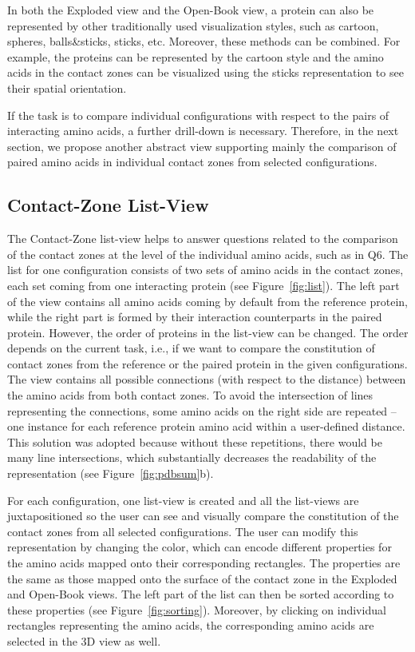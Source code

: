 \documentclass{bmcart}
\def\OpBook {Open-Book view\xspace}
\def\ExpView {Exploded view\xspace}
\def\CoZoListView {Contact-Zone list-view\xspace}
\begin{document}
In both the \ExpView and the \OpBook, a protein can also be represented by other traditionally used visualization styles, such as cartoon, spheres, balls\&sticks, sticks, etc.
Moreover, these methods can be combined. 
For example, the proteins can be represented by the cartoon style and the amino acids in the contact zones can be visualized using the sticks representation to see their spatial orientation.%

If the task is to compare individual configurations with respect to the pairs of interacting amino acids, a further drill-down is necessary.
Therefore, in the next section, we propose another abstract view supporting mainly the comparison of paired amino acids in individual contact zones from selected configurations.


\subsection*{Contact-Zone List-View}
The \CoZoListView helps to answer questions related to the comparison of the contact zones at the level of the individual amino acids, such as in Q6.
The list for one configuration consists of two sets of amino acids in the contact zones, each set coming from one interacting protein (see Figure~\ref{fig:list}).
The left part of the view contains all amino acids coming by default from the reference protein, while the right part is formed by their interaction counterparts in the paired protein.
However, the order of proteins in the list-view can be changed.
The order depends on the current task, i.e., if we want to compare the constitution of contact zones from the reference or the paired protein in the given configurations.
The view contains all possible connections (with respect to the distance) between the amino acids from both contact zones.
To avoid the intersection of lines representing the connections, some amino acids on the right side are repeated -- one instance for each reference protein amino acid within a user-defined distance. 
This solution was adopted because without these repetitions, there would be many line intersections, which substantially decreases the readability of the representation (see Figure~\ref{fig:pdbsum}b).

For each configuration, one list-view is created and all the list-views are juxtapositioned so the user can see and visually compare the constitution of the contact zones from all selected configurations.
The user can modify this representation by changing the color, which can encode different properties for the amino acids mapped onto their corresponding rectangles.
The properties are the same as those mapped onto the surface of the contact zone in the Exploded and Open-Book views.
The left part of the list can then be sorted according to these properties (see Figure~\ref{fig:sorting}).
Moreover, by clicking on individual rectangles representing the amino acids, the corresponding amino acids are selected in the 3D view as well.
\end{document}
